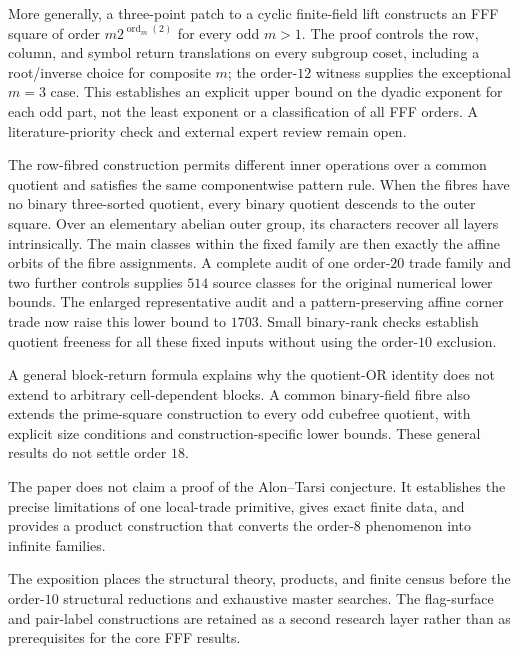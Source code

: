 More generally, a three-point patch to a cyclic finite-field lift constructs
an FFF square of order $m2^{\operatorname{ord}_m(2)}$ for every odd $m>1$.
The proof controls the row, column, and symbol return translations on every
subgroup coset, including a root/inverse choice for composite $m$; the
order-$12$ witness supplies the exceptional $m=3$ case.  This establishes an
explicit upper bound on the dyadic exponent for each odd part, not the least
exponent or a classification of all FFF orders.  A literature-priority check
and external expert review remain open.

The row-fibred construction permits different inner operations over a
common quotient and satisfies the same componentwise pattern rule.
When the fibres have no binary three-sorted quotient, every binary
quotient descends to the outer square. Over an elementary abelian
outer group, its characters recover all layers intrinsically.
The main classes within the fixed family are then exactly the
affine orbits of the fibre assignments. A complete audit of one
order-$20$ trade family and two further controls supplies $514$
source classes for the original numerical lower bounds. The enlarged
representative audit and a pattern-preserving affine corner trade now
raise this lower bound to $1703$. Small binary-rank checks establish
quotient freeness for all these fixed inputs without using the
order-$10$ exclusion.

A general block-return formula explains why the quotient-OR identity
does not extend to arbitrary cell-dependent blocks. A common binary-field
fibre also extends the prime-square construction to every odd cubefree
quotient, with explicit size conditions and construction-specific lower
bounds. These general results do not settle order $18$.

The paper does not claim a proof of the Alon--Tarsi conjecture. It establishes
the precise limitations of one local-trade primitive, gives exact finite
data, and provides a product construction that converts the order-$8$
phenomenon into infinite families.

The exposition places the structural theory, products, and finite census
before the order-$10$ structural reductions and exhaustive master searches. The flag-surface and
pair-label constructions are retained as a second research layer rather than
as prerequisites for the core FFF results.
